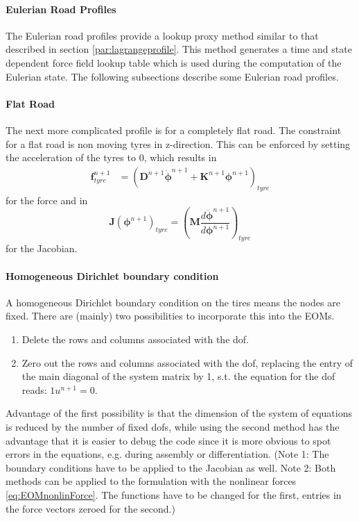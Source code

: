 \paragraph{Eulerian Road Profiles} \label{par:EulerianRoad}
\noindent The Eulerian road profiles provide a lookup proxy method similar to that described in section \ref{par:lagrangeprofile}. This method generates a time and state dependent force field lookup table which is used during the computation of the Eulerian state. The following subsections describe some Eulerian road profiles.

\paragraph{Flat Road} \label{par:FlatRoad}
The next more complicated profile is for a completely flat road. The constraint for a flat road is non moving tyres in z-direction. This can be enforced by setting the acceleration of the tyres to 0, which results in
\begin{align}
    \boldsymbol{f}^{n+1}_{tyre} &=  \left(\boldsymbol{D}^{n+1} \dot{\boldsymbol{\phi}}^{n+1} + \boldsymbol{K}^{n+1}\boldsymbol{\phi}^{n+1}\right)_{tyre}
\end{align}
for the force and in
\begin{equation}
     \boldsymbol{J}(\boldsymbol{\phi}^{n+1})_{tyre} = \left(\boldsymbol{M} \frac{d \ddot{\boldsymbol{\phi}}^{n+1}}{d \boldsymbol{\phi}^{n+1}}\right)_{tyre}
\end{equation}
for the Jacobian.

\paragraph{Homogeneous Dirichlet boundary condition}
A homogeneous Dirichlet boundary condition on the tires means the nodes are fixed. There are (mainly) two possibilities to incorporate this into the EOMs.
\begin{enumerate}
	\item Delete the rows and columns associated with the dof.
	\item Zero out the rows and columns associated with the dof, replacing the entry of the main diagonal of the system matrix by 1, s.t. the equation for the dof reads: $1 u^{n+1} = 0$. 
\end{enumerate}
Advantage of the first possibility is that the dimension of the system of equations is reduced by the number of fixed dofs, while using the second method has the advantage that it is easier to debug the code since it is more obvious to spot errors in the equations, e.g. during assembly or differentiation.
(Note 1: The boundary conditions have to be applied to the Jacobian as well. Note 2: Both methods can be applied to the formulation with the nonlinear forces \eqref{eq:EOMnonlinForce}. The functions have to be changed for the first, entries in the force vectors zeroed for the second.)

